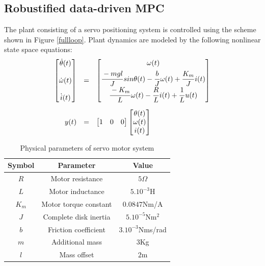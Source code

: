 \documentclass[letterpaper, 10 pt, conference]{ieeeconf}  %
\begin{document}
	\subsection{Robustified data-driven MPC }
	The plant consisting of a servo positioning system is controlled using the scheme shown in Figure \ref{fullloop}. Plant dynamics are modeled by the following nonlinear state space equations:
	\begin{equation*}
	\small
	\begin{array}{rcl}
	\begin{bmatrix}
	\dot{\theta}(t) \vspace{12pt} \\
	\dot{\omega}(t) \vspace{12pt} \\
	\dot{i}(t)
	\end{bmatrix} &=& 
	\begin{bmatrix}
	\omega(t) \vspace{3pt}\\
	\cfrac{-mgl}{J}\hspace{1pt}sin\theta(t)-\cfrac{b}{J}\hspace{1pt}\omega(t) + \cfrac{K_m}{J}\hspace{1pt}i(t) \\  
	\cfrac{-K_m}{L}\hspace{1pt}\omega(t)-\cfrac{R}{L}\hspace{1pt}i(t) + \cfrac{1}{L}\hspace{1pt}u(t)
	\end{bmatrix} \vspace{10pt}\\
	y(t) &=& \begin{bmatrix} 1 & 0 & 0 \end{bmatrix} 
	\begin{bmatrix} \theta(t) \\ \omega(t) \\ i(t) \end{bmatrix} 
	\end{array}
	\end{equation*}
	\begin{table}[h!]
		\hspace{20pt}
		\begin{tabular}{||c|c|c||} 
			\hline
			Symbol & Parameter & Value\\ [0.5ex] 
			\hline\hline
			$R$ & Motor resistance & $5\Omega$ \\ 
			$L$ & Motor inductance & $5.10^{-3}$H \\
			$K_m$ & Motor torque constant & $0.0847$Nm/A \\
			$J$ & Complete disk inertia & $5.10^{-5}$Nm$^2$ \\
			$b$ & Friction coefficient & $3.10^{-3}$Nms/rad \\
			$m$ & Additional mass & $3$Kg \\
			$l$ & Mass offset & $2$m \\
			\hline
		\end{tabular}
		\caption{Physical parameters of servo motor system}
		\label{Simparam}
		\vspace{-10pt}  
	\end{table}
\end{document}
